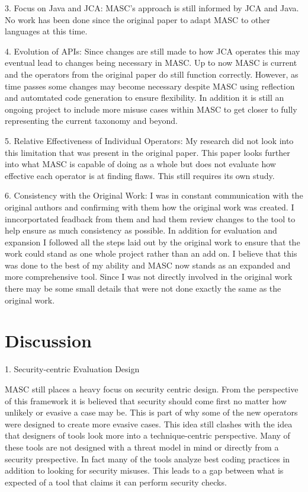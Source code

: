 3. Focus on Java and JCA: MASC's approach is still informed by JCA and Java. No work has been done since the original paper to adapt MASC to other languages at this time.

4. Evolution of APIs: Since changes are still made to how JCA operates this may eventual lead to changes being necessary in MASC. Up to now MASC is current and the operators from the original paper do still function correctly. However, as time passes some changes may become necessary despite MASC using reflection and automtated code generation to ensure flexibility. In addition it is still an ongoing project to include more misuse cases within MASC to get closer to fully representing the current taxonomy and beyond.

5. Relative Effectiveness of Individual Operators: My research did not look into this limitation that was present in the original paper. This paper looks further into what MASC is capable of doing as a whole but does not evaluate how effective each operator is at finding flaws. This still requires its own study.

6. Consistency with the Original Work: I was in constant communication with the original authors and confirming with them how the original work was created. I inncorportated feadback from them and had them review changes to the tool to help ensure as much consistency as possible. In addition for evaluation and expansion I followed all the steps laid out by the original work to ensure that the work could stand as one whole project rather than an add on. I believe that this was done to the best of my ability and MASC now stands as an expanded and more comprehensive tool. Since I was not directly involved in the original work there may be some small details that were not done exactly the same as the original work.

\section{Discussion}
\label{ch6:sec:discussion}

1. Security-centric Evaluation Design

MASC still places a heavy focus on security centric design. From the perspective of this framework it is believed that security should come first no matter how unlikely or evasive a case may be. This is part of why some of the new operators were designed to create more evasive cases. This idea still clashes with the idea that designers of tools look more into a technique-centric perspective. Many of these tools are not designed with a threat model in mind or directly from a security prespective. In fact many of the tools analyze best coding practices in addition to looking for security misuses. This leads to a gap between what is expected of a tool that claims it can perform security checks.

